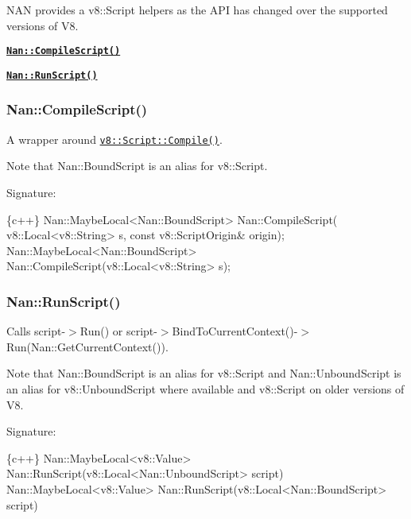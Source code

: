 N\+AN provides a {\ttfamily v8\+::\+Script} helpers as the A\+PI has changed over the supported versions of V8.


\begin{DoxyItemize}
\item \href{#api_nan_compile_script}{\tt {\bfseries {\ttfamily Nan\+::\+Compile\+Script()}}}
\item \href{#api_nan_run_script}{\tt {\bfseries {\ttfamily Nan\+::\+Run\+Script()}}}
\end{DoxyItemize}

\label{_api_nan_compile_script}%
 \subsubsection*{Nan\+::\+Compile\+Script()}

A wrapper around \href{https://v8docs.nodesource.com/io.js-3.0/da/da5/classv8_1_1_script_compiler.html#a93f5072a0db55d881b969e9fc98e564b}{\tt {\ttfamily v8\+::\+Script\+::\+Compile()}}.

Note that {\ttfamily Nan\+::\+Bound\+Script} is an alias for {\ttfamily v8\+::\+Script}.

Signature\+:


\begin{DoxyCode}
\{c++\}
Nan::MaybeLocal<Nan::BoundScript> Nan::CompileScript(
    v8::Local<v8::String> s,
    const v8::ScriptOrigin& origin);
Nan::MaybeLocal<Nan::BoundScript> Nan::CompileScript(v8::Local<v8::String> s);
\end{DoxyCode}


\label{_api_nan_run_script}%
 \subsubsection*{Nan\+::\+Run\+Script()}

Calls {\ttfamily script-\/$>$Run()} or {\ttfamily script-\/$>$Bind\+To\+Current\+Context()-\/$>$Run(\+Nan\+::\+Get\+Current\+Context())}.

Note that {\ttfamily Nan\+::\+Bound\+Script} is an alias for {\ttfamily v8\+::\+Script} and {\ttfamily Nan\+::\+Unbound\+Script} is an alias for {\ttfamily v8\+::\+Unbound\+Script} where available and {\ttfamily v8\+::\+Script} on older versions of V8.

Signature\+:


\begin{DoxyCode}
\{c++\}
Nan::MaybeLocal<v8::Value> Nan::RunScript(v8::Local<Nan::UnboundScript> script)
Nan::MaybeLocal<v8::Value> Nan::RunScript(v8::Local<Nan::BoundScript> script) 
\end{DoxyCode}
 